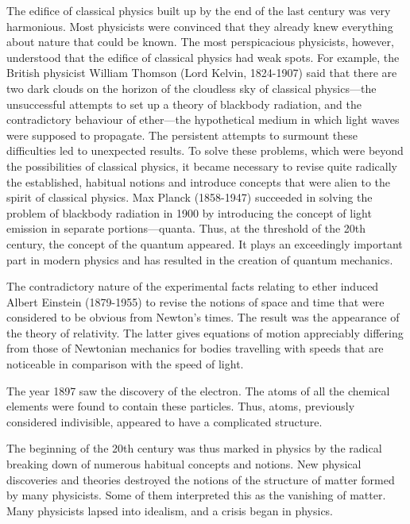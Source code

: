 The edifice of classical physics built up by the end of the last century was very harmonious. Most physicists were convinced that they already knew everything about nature that could be known. The most perspicacious physicists, however, understood that the edifice of classical physics had weak spots. For example, the British physicist William Thomson (Lord Kelvin, 1824-1907) said that there are two dark clouds on the horizon of the cloudless sky of classical physics---the unsuccessful attempts to set up a theory of blackbody radiation, and the contradictory behaviour of ether---the hypothetical medium in which light waves were supposed to propagate. The persistent attempts to surmount these difficulties led to unexpected results. To solve these problems, which were beyond the possibilities of classical physics, it became necessary to revise quite radically the established, habitual notions and introduce concepts that were alien to the spirit of classical physics. Max Planck (1858-1947) succeeded in solving the problem of blackbody radiation in 1900 by introducing the concept of light emission in separate portions---quanta. Thus, at the threshold of the 20th century, the concept of the quantum appeared. It plays an exceedingly important part in modern physics and has resulted in the creation of quantum mechanics.

The contradictory nature of the experimental facts relating to ether induced Albert Einstein (1879-1955) to revise the notions of space and time that were considered to be obvious from Newton's times. The result was the appearance of the theory of relativity. The latter gives equations of motion appreciably differing from those of Newtonian mechanics for bodies travelling with speeds that are noticeable in comparison with the speed of light.

The year 1897 saw the discovery of the electron. The atoms of all the chemical elements were found to contain these particles. Thus, atoms, previously considered indivisible, appeared to have a complicated structure.

The beginning of the 20th century was thus marked in physics by the radical breaking down of numerous habitual concepts and notions. New physical discoveries and theories destroyed the notions of the structure of matter formed by many physicists. Some of them interpreted this as the vanishing of matter. Many physicists lapsed into idealism, and a crisis began in physics.

